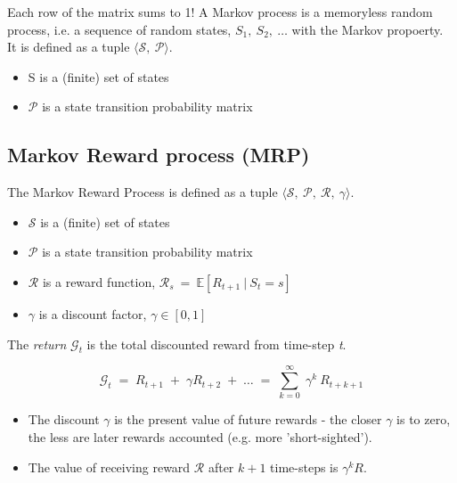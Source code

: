 \documentclass[10pt]{article}
\begin{document}
Each row of the matrix sums to 1! \newline
A Markov process is a memoryless random process, i.e. a sequence of random states, $S_{1}, \: S_{2}, \: \ldots$ with the Markov propoerty. It is defined as a tuple $\langle \mathcal{S}, \: \mathcal{P} \rangle$.
\begin{itemize}
\item S is a (finite) set of states
\item $\mathcal{P}$ is a state transition probability matrix
\end{itemize}

\subsection{Markov Reward process (MRP)}

The Markov Reward Process is defined as a tuple $\langle \mathcal{S}, \: \mathcal{P}, \: \mathcal{R}, \: \gamma \rangle$.
\begin{itemize}
\item $\mathcal{S}$ is a (finite) set of states
\item $\mathcal{P}$ is a state transition probability matrix
\item $\mathcal{R}$ is a reward function, $\mathcal{R}_{s} \: = \: \mathbb{E}[R_{t+1} \: | \: S_{t} = s]$
\item $\gamma$ is a discount factor, $\gamma \in [0,1]$
\end{itemize}

The \textit{return} $\mathcal{G}_{t}$ is the total discounted reward from time-step \textit{t}.

\begin{equation}
\mathcal{G}_{t} \; = \; R_{t+1} \; + \; \gamma R_{t+2} \; + \; \ldots \; = \;  \sum_{k=0}^{\infty} \;\gamma^{k} \: R_{t+k+1} 
\end{equation}

\begin{itemize}
\item The discount $\gamma$ is the present value of future rewards - the closer $\gamma$ is to zero, the less are later rewards accounted (e.g. more 'short-sighted').
\item The value of receiving reward $\mathcal{R}$ after $k+1$ time-steps is $ \gamma^{k} R$.
\end{itemize}
\end{document}
